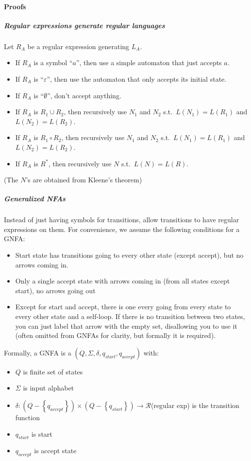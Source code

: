 \documentclass[12 pt]{article}
\begin{document}
\paragraph{Proofs}
\subparagraph{Regular expressions generate regular languages}
Let $R_A$ be a regular expression generating $L_A$.
\begin{itemize}
\item
If $R_A$ is a symbol ``$a$'', then use a simple automaton that just
accepts $a$.
\item
If $R_A$ is ``$\varepsilon$'', then use the automaton that only accepts
its initial state.
\item
  If $R_A$ is ``$\emptyset$'', don't accept anything.
\item If $R_A$ is $R_1 \cup R_2$, then recursively use $N_1$ and $N_2$
  s.t.\ $L(N_1) = L(R_1)$ and $L(N_2) = L(R_2)$.
\item If $R_A$ is $R_1 \circ R_2$, then recursively use $N_1$ and $N_2$
  s.t.\ $L(N_1) = L(R_1)$ and $L(N_2) = L(R_2)$.
\item If $R_A$ is $R^*$, then recursively use $N$
  s.t.\ $L(N) = L(R)$.
\end{itemize}
(The $N$'s are obtained from Kleene's theorem)
\subparagraph{Generalized NFAs}
Instead of just having symbols for transitions, allow transitions to
have regular expressions on them. For convenience, we assume the
following conditions for a GNFA:
\begin{itemize}
\item Start state has transitions going to every other state (except accept), but no arrows
  coming in.
\item Only a single accept state with arrows coming in (from all
  states except start), no arrows going out
\item Except for start and accept, there is one every going from every
  state to every other state and a self-loop. If there is no
  transition between two states, you can just label that arrow with
  the empty set, disallowing you to use it (often omitted from GNFAs
  for clarity, but formally it is required).
\end{itemize}
Formally, a GNFA is a $(Q, \Sigma, \delta, q_{start}, q_{accept})$
with:
\begin{itemize}
\item $Q$ is finite set of states
\item $\Sigma$ is input alphabet
\item $\delta: (Q - \left\{q_{accept}\right\}) \times (Q -
  \left\{q_{start}\right\}) \to \mathcal{R}$(regular exp) is the transition
  function
\item $q_{start}$ is start
\item $q_{accept}$ is accept state
\end{itemize}
\end{document}
